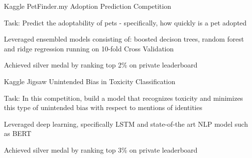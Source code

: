 

\begin{cventries}
  \cventry
    {Kaggle} %
    {PetFinder.my Adoption Prediction Competition} %
    {} %
    {} %
    {
      \begin{cvitems} %
      \item {Task: Predict the adoptability of pets - specifically, how quickly is a pet adopted}
      \item {Leveraged ensembled models consisting of: boosted decison trees, random forest and ridge regression running on 10-fold Cross Validation}
      \item {Achieved silver medal by ranking top 2\% on private leaderboard}
      \end{cvitems}
    }
  \cventry
    {Kaggle} %
    {Jigsaw Unintended Bias in Toxicity Classification} %
    {} %
    {} %
    {
      \begin{cvitems} %
      \item {Task: In this competition, build a model that recognizes toxicity and minimizes this type of unintended bias with respect to mentions of identities}
      \item {Leveraged deep learning, specifically LSTM and state-of-the art NLP model such as BERT}
      \item {Achieved silver medal by ranking top 3\% on private leaderboard}
      \end{cvitems}
    }
\end{cventries}
